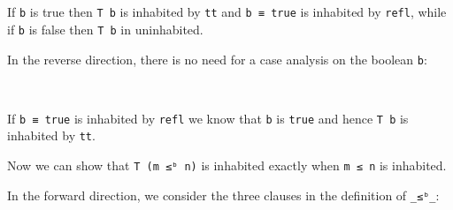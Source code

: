 \begin{fence}
\begin{code}%
\>[0]\AgdaSpace{}%
\AgdaSymbol{:}\AgdaSpace{}%
\AgdaSpace{}%
\AgdaSymbol{(}\AgdaSpace{}%
\AgdaSymbol{:}\AgdaSpace{}%
\AgdaSymbol{)}\AgdaSpace{}%
\AgdaSpace{}%
\AgdaSpace{}%
\AgdaSpace{}%
\AgdaSpace{}%
\AgdaSpace{}%
\AgdaSpace{}%
\<%
\\
\>[0]\AgdaSpace{}%
\AgdaSpace{}%
%
\>[14]\AgdaSymbol{=}%
\>[17]\<%
\\
\>[0]\AgdaSpace{}%
\AgdaSpace{}%
\AgdaSymbol{()}\<%
\end{code}
\end{fence}

If \texttt{b} is true then \texttt{T\ b} is inhabited by \texttt{tt} and
\texttt{b\ ≡\ true} is inhabited by \texttt{refl}, while if \texttt{b}
is false then \texttt{T\ b} in uninhabited.

In the reverse direction, there is no need for a case analysis on the
boolean \texttt{b}:

\begin{fence}
\begin{code}%
\>[0]\AgdaSpace{}%
\AgdaSymbol{:}\AgdaSpace{}%
\AgdaSpace{}%
\AgdaSymbol{\{}\AgdaSpace{}%
\AgdaSymbol{:}\AgdaSpace{}%
\AgdaSymbol{\}}\AgdaSpace{}%
\AgdaSpace{}%
\AgdaSpace{}%
\AgdaSpace{}%
\AgdaSpace{}%
\AgdaSpace{}%
\AgdaSpace{}%
\<%
\\
\>[0]\AgdaSpace{}%
%
\>[10]\AgdaSymbol{=}%
\>[13]\<%
\end{code}
\end{fence}

If \texttt{b\ ≡\ true} is inhabited by \texttt{refl} we know that
\texttt{b} is \texttt{true} and hence \texttt{T\ b} is inhabited by
\texttt{tt}.

Now we can show that \texttt{T\ (m\ ≤ᵇ\ n)} is inhabited exactly when
\texttt{m\ ≤\ n} is inhabited.

In the forward direction, we consider the three clauses in the
definition of \texttt{\_≤ᵇ\_}:

